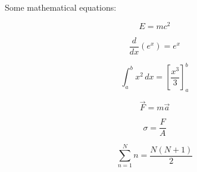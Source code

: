 Some mathematical equations:

\begin{equation}
    E = mc^2
\end{equation}

\begin{equation}
    \frac{d}{dx} \left( e^{x} \right) = e^{x}
\end{equation}

\begin{equation}
    \int_{a}^{b} x^2 \, dx = \left[ \frac{x^3}{3} \right]_{a}^{b}
\end{equation}

\begin{equation}
    \vec{F} = m \vec{a}
\end{equation}

\begin{equation}
    \sigma = \frac{F}{A}
\end{equation}

\begin{equation}
    \sum_{n=1}^{N} n = \frac{N(N+1)}{2}
\end{equation}